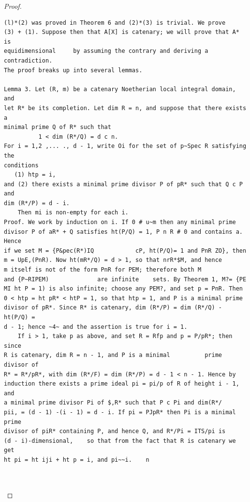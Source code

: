 \begin{proof}
\begin{verbatim}
(l)*(2) was proved in Theorem 6 and (2)*(3) is trivial. We prove
(3) + (1). Suppose then that A[X] is catenary; we will prove that A* is
equidimensional     by assuming the contrary and deriving a contradiction.
The proof breaks up into several lemmas.

Lemma 3. Let (R, m) be a catenary Noetherian local integral domain, and
let R* be its completion. Let dim R = n, and suppose that there exists a
minimal prime Q of R* such that
          1 < dim (R*/Q) = d c n.
For i = 1,2 ,... ., d - 1, write Oi for the set of p~Spec R satisfying the
conditions
   (1) htp = i,
and (2) there exists a minimal prime divisor P of pR* such that Q c P and
dim (R*/P) = d - i.
    Then mi is non-empty for each i.
Proof. We work by induction on i. If 0 # u~m then any minimal prime
divisor P of aR* + Q satisfies ht(P/Q) = 1, P n R # 0 and contains a. Hence
if we set M = {P&pec(R*)IQ            cP, ht(P/Q)= 1 and PnR ZO}, then
m = UpE,(PnR). Now ht(mR*/Q) = d > 1, so that nrR*$M, and hence
m itself is not of the form PnR for PEM; therefore both M
and {P~RIPEM)              are infinite    sets. By Theorem 1, M?= {PE
MI ht P = 1) is also infinite; choose any PEM?, and set p = PnR. Then
0 < htp = ht pR* < htP = 1, so that htp = 1, and P is a minimal prime
divisor of pR*. Since R* is catenary, dim (R*/P) = dim (R*/Q) - ht(P/Q) =
d - 1; hence ~4~ and the assertion is true for i = 1.
    If i > 1, take p as above, and set R = Rfp and p = P/pR*; then since
R is catenary, dim R = n - 1, and P is a minimal          prime divisor of
R* = R*/pR*, with dim (R*/F) = dim (R*/P) = d - 1 < n - 1. Hence by
induction there exists a prime ideal pi = pi/p of R of height i - 1, and
a minimal prime divisor Pi of $,R* such that P c Pi and dim(R*/
pii, = (d - 1) -(i - 1) = d - i. If pi = PJpR* then Pi is a minimal prime
divisor of piR* containing P, and hence Q, and R*/Pi = ITS/pi is
(d - i)-dimensional,    so that from the fact that R is catenary we get
ht pi = ht iji + ht p = i, and pi~~i.    n



\end{verbatim}
\end{proof}
